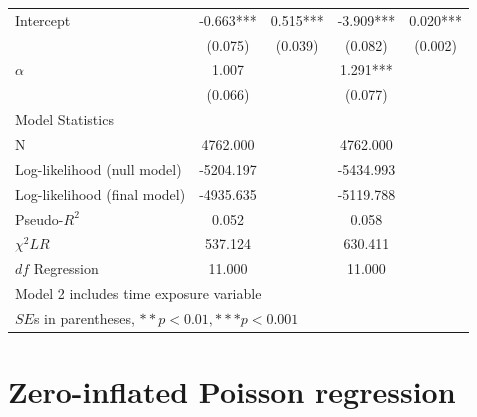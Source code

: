 \begin{table}[htbp]
\begin{tabular}{lcccc}
Intercept    &   -0.663***&    0.515***&   -3.909***&    0.020***\\
      &   (0.075)  &   (0.039)  &   (0.082)  &   (0.002)  \\
$\alpha$  &    1.007 & &      1.291*** \\
       &   (0.066)  & &   (0.077)  \\
\hline
\multicolumn{4}{l}{Model Statistics} \\
\hline
N      &  4762.000  &   &  4762.000  &   \\
Log-likelihood (null model)    &  -5204.197  &   & -5434.993   \\
Log-likelihood (final model)     & -4935.635  &   &  -5119.788    \\
Pseudo-$R^2$    &    0.052  &    &    0.058  &     \\
$\chi^2 LR$    &   537.124  &   &  630.411  &   \\
$df$ Regression    &   11.000  &    &   11.000  &    \\
\hline
\multicolumn{4}{l}{Model 2 includes time exposure variable} \\
\multicolumn{4}{l}{$SE$s in parentheses, $**p<0.01, ***p<0.001$} \\
\hline
\end{tabular}
\end{table}

\section{Zero-inflated Poisson regression}

